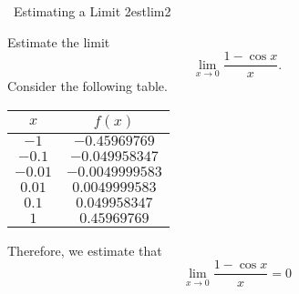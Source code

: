         \begin{example}{\Difficulty\,\Difficulty\,\,Estimating a Limit 2}{estlim2}
            
            Estimate the limit
            \begin{equation*}
                \lim_{x\to 0}\frac{1-\cos x}{x}.
            \end{equation*}
            Consider the following table.
            \begin{center}
                \begin{tabular}{|cc|}
                    \hline
                    \(x\) & \(f(x)\) \\
                    \hline
                    \(-1\) & \(-0.45969769\) \\
                    \(-0.1\) & \(-0.049958347\) \\
                    \(-0.01\) & \(-0.0049999583\) \\
                    \(0.01\) & \(0.0049999583\) \\
                    \(0.1\) & \(0.049958347\) \\
                    \(1\) & \(0.45969769\) \\
                    \hline
                \end{tabular}
            \end{center}
            Therefore, we estimate that 
            \begin{equation*}
                \lim_{x\to 0}\frac{1-\cos x}{x}=0
            \end{equation*}

        \end{example}
        \pagebreak
